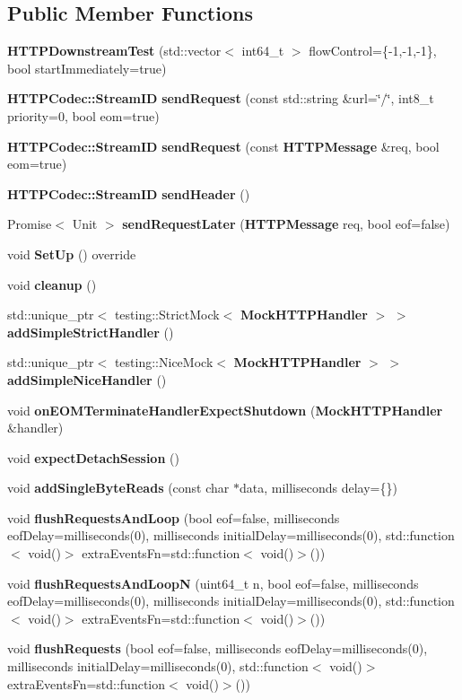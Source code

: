 \subsection*{Public Member Functions}
\begin{DoxyCompactItemize}
\item 
{\bf H\+T\+T\+P\+Downstream\+Test} (std\+::vector$<$ int64\+\_\+t $>$ flow\+Control=\{-\/1,-\/1,-\/1\}, bool start\+Immediately=true)
\item 
{\bf H\+T\+T\+P\+Codec\+::\+Stream\+ID} {\bf send\+Request} (const std\+::string \&url=\char`\"{}/\char`\"{}, int8\+\_\+t priority=0, bool eom=true)
\item 
{\bf H\+T\+T\+P\+Codec\+::\+Stream\+ID} {\bf send\+Request} (const {\bf H\+T\+T\+P\+Message} \&req, bool eom=true)
\item 
{\bf H\+T\+T\+P\+Codec\+::\+Stream\+ID} {\bf send\+Header} ()
\item 
Promise$<$ Unit $>$ {\bf send\+Request\+Later} ({\bf H\+T\+T\+P\+Message} req, bool eof=false)
\item 
void {\bf Set\+Up} () override
\item 
void {\bf cleanup} ()
\item 
std\+::unique\+\_\+ptr$<$ testing\+::\+Strict\+Mock$<$ {\bf Mock\+H\+T\+T\+P\+Handler} $>$ $>$ {\bf add\+Simple\+Strict\+Handler} ()
\item 
std\+::unique\+\_\+ptr$<$ testing\+::\+Nice\+Mock$<$ {\bf Mock\+H\+T\+T\+P\+Handler} $>$ $>$ {\bf add\+Simple\+Nice\+Handler} ()
\item 
void {\bf on\+E\+O\+M\+Terminate\+Handler\+Expect\+Shutdown} ({\bf Mock\+H\+T\+T\+P\+Handler} \&handler)
\item 
void {\bf expect\+Detach\+Session} ()
\item 
void {\bf add\+Single\+Byte\+Reads} (const char $\ast$data, milliseconds delay=\{\})
\item 
void {\bf flush\+Requests\+And\+Loop} (bool eof=false, milliseconds eof\+Delay=milliseconds(0), milliseconds initial\+Delay=milliseconds(0), std\+::function$<$ void()$>$ extra\+Events\+Fn=std\+::function$<$ void()$>$())
\item 
void {\bf flush\+Requests\+And\+LoopN} (uint64\+\_\+t n, bool eof=false, milliseconds eof\+Delay=milliseconds(0), milliseconds initial\+Delay=milliseconds(0), std\+::function$<$ void()$>$ extra\+Events\+Fn=std\+::function$<$ void()$>$())
\item 
void {\bf flush\+Requests} (bool eof=false, milliseconds eof\+Delay=milliseconds(0), milliseconds initial\+Delay=milliseconds(0), std\+::function$<$ void()$>$ extra\+Events\+Fn=std\+::function$<$ void()$>$())

\end{DoxyCompactItemize}
